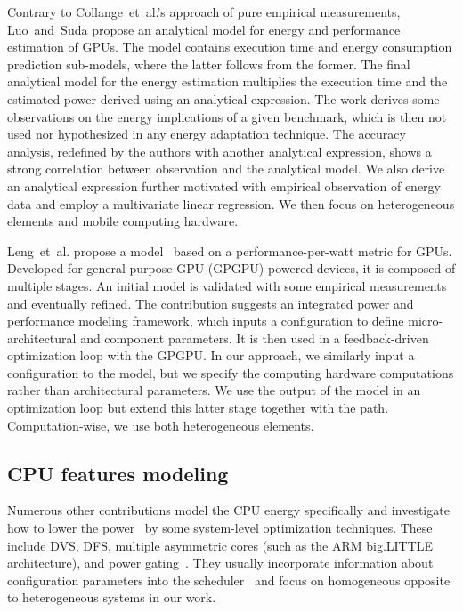 Contrary to Collange~et~al.'s approach of pure empirical measurements, Luo~and~Suda\citep{luo2011performance} propose an analytical model for energy and performance estimation of GPUs. The model contains execution time and energy consumption prediction sub-models, where the latter follows from the former. The final analytical model for the energy estimation multiplies the execution time and the estimated power derived using an analytical expression. The work derives some observations on the energy implications of a given benchmark, which is then not used nor hypothesized in any energy adaptation technique. The accuracy analysis, redefined by the authors with another analytical expression, shows a strong correlation between observation and the analytical model. We also derive an analytical expression further motivated with empirical observation of energy data and employ a multivariate linear regression. We then focus on heterogeneous elements and mobile computing hardware.

Leng~et~al. propose a model~\citep{leng2013gpuwattch} based on a performance-per-watt metric for GPUs. Developed for general-purpose GPU (GPGPU) powered devices, it is composed of multiple stages. An initial model is validated with some empirical measurements and eventually refined.  The contribution suggests an integrated power and performance modeling framework, which inputs a configuration to define micro-architectural and component parameters. It is then used in a feedback-driven optimization loop with the GPGPU. In our approach, we similarly input a configuration to the model, but we specify the computing hardware computations rather than architectural parameters. We use the output of the model in an optimization loop but extend this latter stage together with the path. Computation-wise, we use both heterogeneous elements.

\subsection{CPU features modeling}
\label{sec:soa-cpu}

Numerous other contributions model the CPU energy specifically and investigate how to lower the power~\citep{hong1999power, luo2001battery, chowdhury2005static} by some system-level optimization techniques. These include DVS, DFS, multiple asymmetric cores (such as the ARM big.LITTLE architecture), and power gating~\citep{walker2017accurate}. They usually incorporate information about configuration parameters into the scheduler~\citep{seewald2019coarse} and focus on homogeneous opposite to heterogeneous systems in our work. 

